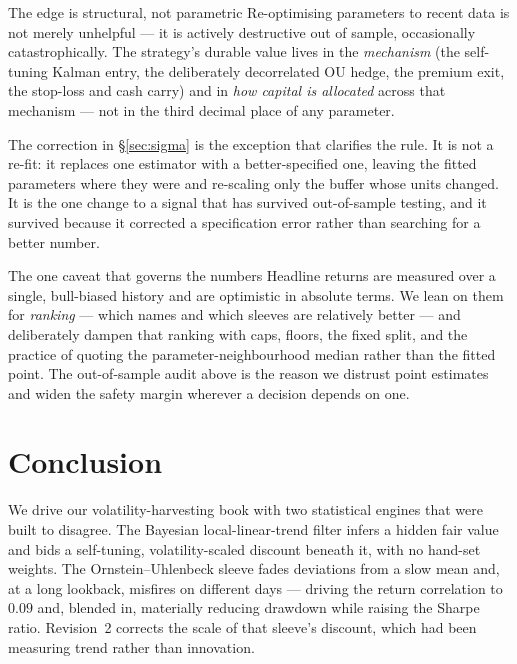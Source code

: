 \documentclass[11pt]{article}
\begin{document}
\begin{keybox}{The edge is structural, not parametric}
Re-optimising parameters to recent data is not merely unhelpful --- it is actively destructive out
of sample, occasionally catastrophically. The strategy's durable value lives in the
\emph{mechanism} (the self-tuning Kalman entry, the deliberately decorrelated OU hedge, the
premium exit, the stop-loss and cash carry) and in \emph{how capital is allocated} across that
mechanism --- not in the third decimal place of any parameter.

The correction in \S\ref{sec:sigma} is the exception that clarifies the rule. It is not a re-fit:
it replaces one estimator with a better-specified one, leaving the fitted parameters where they
were and re-scaling only the buffer whose units changed. It is the one change to a signal that
has survived out-of-sample testing, and it survived because it corrected a specification error
rather than searching for a better number.
\end{keybox}

\begin{keybox}{The one caveat that governs the numbers}
Headline returns are measured over a single, bull-biased history and are optimistic in absolute
terms. We lean on them for \emph{ranking} --- which names and which sleeves are relatively better
--- and deliberately dampen that ranking with caps, floors, the fixed split, and the practice of
quoting the parameter-neighbourhood median rather than the fitted point. The out-of-sample audit
above is the reason we distrust point estimates and widen the safety margin wherever a decision
depends on one.
\end{keybox}

\section{Conclusion}

We drive our volatility-harvesting book with two statistical engines that were built to disagree.
The Bayesian local-linear-trend filter infers a hidden fair value and bids a self-tuning,
volatility-scaled discount beneath it, with no hand-set weights. The Ornstein--Uhlenbeck sleeve
fades deviations from a slow mean and, at a long lookback, misfires on different days --- driving
the return correlation to $0.09$ and, blended in, materially reducing drawdown while raising the
Sharpe ratio. Revision~2 corrects the scale of that sleeve's discount, which had been measuring
trend rather than innovation.
\end{document}
